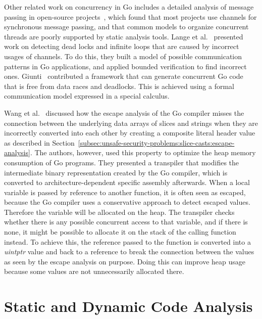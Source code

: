 Other related work on concurrency in Go includes a detailed analysis of message passing in open-source
projects~\cite{dilley2019}, which found that most projects use channels for synchronous message passing, and that common
models to organize concurrent threads are poorly supported by static analysis tools.
Lange et al.~\cite{lange2017} presented work on detecting dead locks and infinite loops that are caused by incorrect
usages of channels.
To do this, they built a model of possible communication patterns in Go applications, and applied bounded verification
to find incorrect ones.
Giunti~\cite{giunti2020} contributed a framework that can generate concurrent Go code that is free from data races and
deadlocks.
This is achieved using a formal communication model expressed in a special calculus.

Wang et al.~\cite{wang2020} discussed how the escape analysis of the Go compiler misses the connection between the
underlying data arrays of slices and strings when they are incorrectly converted into each other by creating a composite
literal header value as described in Section~\ref{subsec:unsafe-security-problems:slice-casts:escape-analysis}.
The authors, however, used this property to optimize the heap memory consumption of Go programs.
They presented a transpiler that modifies the intermediate binary representation created by the Go compiler, which is
converted to architecture-dependent specific assembly afterwards.
When a local variable is passed by reference to another function, it is often seen as escaped, because the Go compiler
uses a conservative approach to detect escaped values.
Therefore the variable will be allocated on the heap.
The transpiler checks whether there is any possible concurrent access to that variable, and if there is none, it might
be possible to allocate it on the stack of the calling function instead.
To achieve this, the reference passed to the function is converted into a \textit{uintptr} value and back to a reference
to break the connection between the values as seen by the escape analysis on purpose.
Doing this can improve heap usage because some values are not unnecessarily allocated there.



\section{Static and Dynamic Code Analysis}\label{sec:related-work:static-code-analysis}

